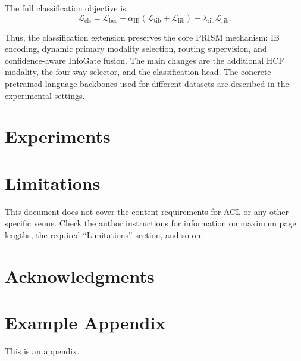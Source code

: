 \documentclass[11pt]{article}
\begin{document}
The full classification objective is:
\begin{equation}
\mathcal{L}_{\mathrm{cls}}
=
\mathcal{L}_{\mathrm{bce}}
+
\alpha_{\mathrm{IB}}
(\mathcal{L}_{\mathrm{tib}}+\mathcal{L}_{\mathrm{lib}})
+
\lambda_{\mathrm{rib}}\mathcal{L}_{\mathrm{rib}}.
\end{equation}

Thus, the classification extension preserves the core PRISM mechanism:
IB encoding, dynamic primary modality selection, routing supervision, and
confidence-aware InfoGate fusion. The main changes are the additional HCF
modality, the four-way selector, and the classification head. The concrete
pretrained language backbones used for different datasets are described in the
experimental settings.

\section{Experiments}
\section*{Limitations}

This document does not cover the content requirements for ACL or any
other specific venue.  Check the author instructions for
information on
maximum page lengths, the required ``Limitations'' section,
and so on.

\section*{Acknowledgments}



%



\appendix

\section{Example Appendix}
\label{sec:appendix}

This is an appendix.
\end{document}
